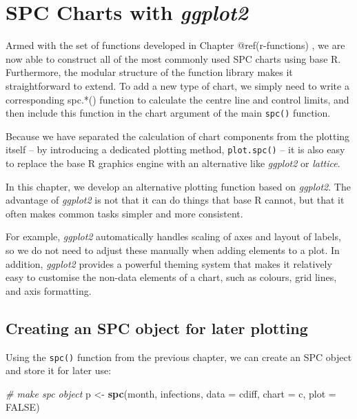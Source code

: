 \documentclass[
]{book}
\newenvironment{Shaded}{\begin{snugshade}}{\end{snugshade}}
\newcommand{\AttributeTok}[1]{\textcolor[rgb]{0.13,0.29,0.53}{#1}}
\newcommand{\CommentTok}[1]{\textcolor[rgb]{0.56,0.35,0.01}{\textit{#1}}}
\newcommand{\ConstantTok}[1]{\textcolor[rgb]{0.56,0.35,0.01}{#1}}
\newcommand{\FunctionTok}[1]{\textcolor[rgb]{0.13,0.29,0.53}{\textbf{#1}}}
\newcommand{\NormalTok}[1]{#1}
\newcommand{\OtherTok}[1]{\textcolor[rgb]{0.56,0.35,0.01}{#1}}
\newcommand{\StringTok}[1]{\textcolor[rgb]{0.31,0.60,0.02}{#1}}
\begin{document}
\chapter{\texorpdfstring{SPC Charts with
\emph{ggplot2}}{SPC Charts with ggplot2}}\label{ggplot}

Armed with the set of functions developed in Chapter @ref(r-functions) ,
we are now able to construct all of the most commonly used SPC charts
using base R. Furthermore, the modular structure of the function library
makes it straightforward to extend. To add a new type of chart, we
simply need to write a corresponding spc.*() function to calculate the
centre line and control limits, and then include this function in the
chart argument of the main \texttt{spc()} function.

Because we have separated the calculation of chart components from the
plotting itself -- by introducing a dedicated plotting method,
\texttt{plot.spc()} -- it is also easy to replace the base R graphics
engine with an alternative like \emph{ggplot2} or \emph{lattice}.

In this chapter, we develop an alternative plotting function based on
\emph{ggplot2}. The advantage of \emph{ggplot2} is not that it can do
things that base R cannot, but that it often makes common tasks simpler
and more consistent.

For example, \emph{ggplot2} automatically handles scaling of axes and
layout of labels, so we do not need to adjust these manually when adding
elements to a plot. In addition, \emph{ggplot2} provides a powerful
theming system that makes it relatively easy to customise the non-data
elements of a chart, such as colours, grid lines, and axis formatting.

\section{Creating an SPC object for later
plotting}\label{creating-an-spc-object-for-later-plotting}

Using the \texttt{spc()} function from the previous chapter, we can
create an SPC object and store it for later use:

\begin{Shaded}
\begin{Highlighting}[]
\CommentTok{\# make spc object}
\NormalTok{p }\OtherTok{\textless{}{-}} \FunctionTok{spc}\NormalTok{(month, infections,}
         \AttributeTok{data  =}\NormalTok{ cdiff,}
         \AttributeTok{chart =} \StringTok{\textquotesingle{}c\textquotesingle{}}\NormalTok{,}
         \AttributeTok{plot  =} \ConstantTok{FALSE}\NormalTok{)}
\end{Highlighting}
\end{Shaded}
\end{document}
